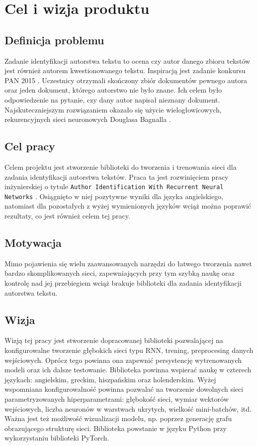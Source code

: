 \newpage
\section{Cel i wizja produktu}

\subsection{Definicja problemu}
Zadanie identyfikacji autorstwa tekstu to ocena czy autor danego zbioru tekstów jest również 
autorem kwestionowanego tekstu. Inspiracją jest zadanie konkursu PAN 2015 \cite{pan}. Uczestnicy otrzymali 
skończony zbiór dokumentów pewnego autora oraz jeden dokument, którego autorstwo nie było znane.
Ich celem było odpowiedzenie na pytanie, czy dany autor napisał nieznany dokument.
Najskuteczniejszym rozwiązaniem okazało się użycie wielogłowicowych, rekurencyjnych sieci 
neuronowych Douglasa Bagnalla \cite{bagnall}.

 
\subsection{Cel pracy}
Celem projektu jest stworzenie biblioteki do tworzenia i trenowania sieci dla zadania 
identyfikacji autorstwa tekstów. Praca ta jest rozwinięciem pracy inżynierskiej o tytule 
\texttt{Author Identification With Recurrent Neural Networks} \cite{radzio}. Osiągnięto w niej pozytywne wyniki dla języka 
angielskiego, natomiast dla pozostałych z wyżej wymienionych języków wciąż można poprawić rezultaty,
co jest również celem tej pracy.


\subsection{Motywacja}
Mimo pojawienia się wielu zaawansowanych narzędzi do łatwego tworzenia nawet bardzo skomplikowanych sieci, 
zapewniających przy tym szybką naukę oraz kontrolę nad jej przebiegiem wciąż brakuje biblioteki dla zadania identyfikacji autorstwa 
tekstu.

\subsection{Wizja}
Wizją tej pracy jest stworzenie dopracowanej biblioteki pozwalającej na konfigurowalne tworzenie 
głębokich sieci typu RNN, trening, preprocesing danych wejściowych. Oprócz tego powinna ona 
zapewnić persystencję wytrenowanych modeli oraz ich dalsze testowanie. Biblioteka powinna wspierać 
naukę w czterech językach: angielskim, greckim, hiszpańskim oraz holenderskim. Wyżej wspomniana konfigurowalność powinna 
pozwalać na tworzenie dowolnych sieci parametryzowanych hiperparametrami: głębokość sieci, wymiar 
wektorów wejściowych, liczba neuronów w warstwach ukrytych, wielkość mini-batchów, itd. Ważna jest 
też możliwość wizualizacji modelu, np. poprzez generację grafu obrazującego strukturę sieci. 
Biblioteka powstanie w języku Python przy wykorzystaniu biblioteki PyTorch.

